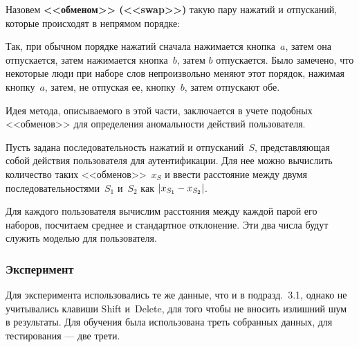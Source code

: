 \begin{multicols}{2}
Назовем {\bf <<обменом>> (<<swap>>)} такую па\-ру нажатий и отпусканий, 
которые происходят в непрямом порядке:

\vspace*{-18pt}

    
    \vspace*{6pt}
    
\noindent
Так, при обычном порядке нажатий сначала нажимается кнопка~$a$,
затем она отпускается, затем нажимается кнопка~$b$, затем $b$
отпускается. Было замечено, что некоторые люди при наборе слов
непроизвольно меняют этот порядок, нажимая кнопку~$a$, затем, не
отпуская ее, кнопку~$b$, затем отпускают обе.

Идея метода, описываемого в этой части, заключается в учете подобных
<<обменов>> для определения аномальности действий пользователя.

Пусть задана последовательность нажатий и отпусканий~$S$,
представляющая собой действия пользователя для аутентификации. Для
нее можно вычислить количество таких <<обменов>>~$x_S$ и ввести
расстояние между двумя последовательностями~$S_1$ и~$S_2$ как
$|x_{S_1}\hm - x_{S_2}|$.

Для каждого пользователя вычислим расстояния между каждой парой его
наборов, посчитаем среднее и стандартное отклонение. Эти два числа
будут служить моделью для пользователя.

\subsubsection{Эксперимент}

Для эксперимента использовались те же данные, что и в подразд.~3.1,
однако не учитывались клавиши {\sf Shift} и~{\sf Delete}, для
того чтобы не вносить излишний шум в результаты. Для обучения была
использована треть собранных данных, для тестирования --- две трети.


\end{multicols}
